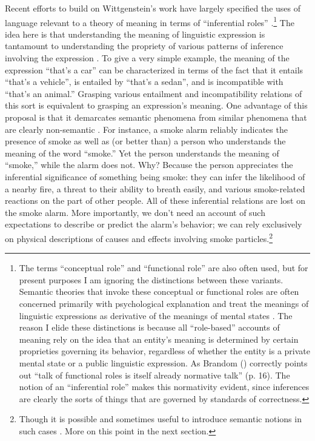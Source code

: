 Recent efforts to build on Wittgenstein's work have largely specified the uses of language relevant to a theory of meaning in terms of ``inferential roles'' \citep{Harman:1982,Brandom:2000,Brandom:1994,Block:1986}.\footnote{The terms ``conceptual role'' and ``functional role'' are also often used, but for present purposes I am ignoring the distinctions between these variants. Semantic theories that invoke these conceptual or functional roles are often concerned primarily with psychological explanation and treat the meanings of linguistic expressions as derivative of the meanings of mental states \citep[e.g.][]{Harman:1982}. The reason I elide these distinctions is because all ``role-based'' accounts of meaning rely on the idea that an entity's meaning is determined by certain proprieties governing its behavior, regardless of whether the entity is a private mental state or a public linguistic expression. As Brandom (\citeyear{Brandom:1994}) correctly points out ``talk of functional roles is itself already normative talk'' (p. 16). The notion of an ``inferential role'' makes this normativity evident, since inferences are clearly the sorts of things that are governed by standards of correctness.} The idea here is that understanding the meaning of linguistic expression is tantamount to understanding the propriety of various patterns of inference involving the expression \citep{Brandom:1994}. To give a very simple example, the meaning of the expression ``that's a car'' can be characterized in terms of the fact that it entails ``that's a vehicle'', is entailed by ``that's a sedan'', and is incompatible with ``that's an animal.'' Grasping various entailment and incompatibility relations of this sort is equivalent to grasping an expression's meaning. One advantage of this proposal is that it demarcates semantic phenomena from similar phenomena that are clearly non-semantic \citep{Brandom:2000,Brandom:1994,Brandom:2009}. For instance, a smoke alarm reliably indicates the presence of smoke as well as (or better than) a person who understands the meaning of the word ``smoke.'' Yet the person understands the meaning of ``smoke,'' while the alarm does not. Why? Because the person appreciates the inferential significance of something being smoke: they can infer the likelihood of a nearby fire, a threat to their ability to breath easily, and various smoke-related reactions on the part of other people. All of these inferential relations are lost on the smoke alarm. More importantly, we don't need an account of such expectations to describe or predict the alarm's behavior; we can rely exclusively on physical descriptions of causes and effects involving smoke particles.\footnote{Though it is possible and sometimes useful to introduce semantic notions in such cases \citep{Dennett:1987,Hochstein:2011}. More on this point in the next section.}

